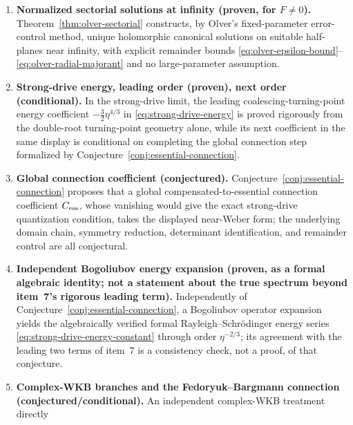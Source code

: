 \documentclass[11pt]{article}
\theoremstyle{remark}
\begin{document}
\begin{enumerate}
{ algebraic correspondence only).} The normal-form equation is exactly the
 degenerate ($\varepsilon_{\rm D}=0$) parameter specialization
 \eqref{eq:dche-correspondence} of the canonical double-confluent Heun
 family, and the Whittaker--Ince equation separately arises from a distinct
 limiting operation \eqref{eq:whittaker-ince-limit};
 neither correspondence, by itself, identifies a preferred global Heun
 solution, proves a connection formula, or yields an energy-quantization
 condition.
\item \textbf{Normalized sectorial solutions at infinity (proven, for
 $F\ne0$).} Theorem~\ref{thm:olver-sectorial} constructs, by Olver's
 fixed-parameter error-control method, unique holomorphic canonical
 solutions on suitable half-planes near infinity, with explicit remainder
 bounds \eqref{eq:olver-epsilon-bound}--\eqref{eq:olver-radial-majorant} and
 no large-parameter assumption.
\item \textbf{Strong-drive energy, leading order (proven), next order
 (conditional).} In the strong-drive limit, the leading coalescing-turning-point
 energy coefficient $-\tfrac32\eta^{4/3}$ in \eqref{eq:strong-drive-energy}
 is proved rigorously from the double-root turning-point geometry alone,
 while its next coefficient in the same display is conditional on
 completing the global connection step formalized by
 Conjecture~\ref{conj:essential-connection}.
\item \textbf{Global connection coefficient (conjectured).}
 Conjecture~\ref{conj:essential-connection} proposes that a global
 compensated-to-essential connection coefficient $C_{\rm ess}$, whose
 vanishing would give the exact strong-drive quantization condition, takes
 the displayed near-Weber form; the underlying domain chain, symmetry
 reduction, determinant identification, and remainder control are all
 conjectural.
\item \textbf{Independent Bogoliubov energy expansion (proven, as a formal
 algebraic identity; not a statement about the true spectrum beyond item~7's
 rigorous leading term).} Independently of
 Conjecture~\ref{conj:essential-connection}, a Bogoliubov operator expansion
 yields the algebraically verified formal Rayleigh--Schr\"odinger energy
 series \eqref{eq:strong-drive-energy-constant} through order
 $\eta^{-2/3}$; its agreement with the leading two terms of item~7 is a
 consistency check, not a proof, of that conjecture.
\item \textbf{Complex-WKB branches and the Fedoryuk--Bargmann connection
 (conjectured/conditional).} An independent complex-WKB treatment directly

\end{enumerate}
\end{document}
